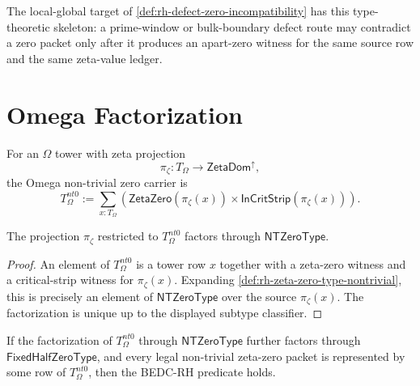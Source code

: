\begin{principle}
\label{prin:rh-zeta-zero-type-defect-zero-skeleton}
The local-global target of
\autoref{def:rh-defect-zero-incompatibility} has this type-theoretic
skeleton: a prime-window or bulk-boundary defect route may contradict a
zero packet only after it produces an apart-zero witness for the same
source row and the same zeta-value ledger.
\end{principle}

\section{Omega Factorization}
\label{sec:rh-zeta-zero-omega-factorization}

\begin{definition}
\label{def:rh-zeta-zero-omega-nontrivial-carrier}
For an $\Omega$ tower with zeta projection
$$
\pi_{\zeta}:T_{\Omega}\to\mathsf{ZetaDom}^{\uparrow},
$$
the Omega non-trivial zero carrier is
$$
T_{\Omega}^{nt0}
:=
\sum_{x:T_{\Omega}}
\left(
\mathsf{ZetaZero}(\pi_{\zeta}(x))
\times
\mathsf{InCritStrip}(\pi_{\zeta}(x))
\right).
$$
\end{definition}

\begin{theorem}
\label{thm:rh-zeta-zero-omega-factors-through-ntzero}
The projection $\pi_{\zeta}$ restricted to $T_{\Omega}^{nt0}$ factors
through $\mathsf{NTZeroType}$.
\end{theorem}

\begin{proof}
An element of $T_{\Omega}^{nt0}$ is a tower row $x$ together with a
zeta-zero witness and a critical-strip witness for $\pi_{\zeta}(x)$.
Expanding \autoref{def:rh-zeta-zero-type-nontrivial}, this is precisely an
element of $\mathsf{NTZeroType}$ over the source
$\pi_{\zeta}(x)$. The factorization is unique up to the displayed subtype
classifier.
\end{proof}

\begin{theorem}
\label{thm:rh-zeta-zero-fixed-half-factorization-sufficient}
If the factorization of $T_{\Omega}^{nt0}$ through
$\mathsf{NTZeroType}$ further factors through
$\mathsf{FixedHalfZeroType}$, and every legal non-trivial zeta-zero packet
is represented by some row of $T_{\Omega}^{nt0}$, then the BEDC-RH
predicate holds.
\end{theorem}

